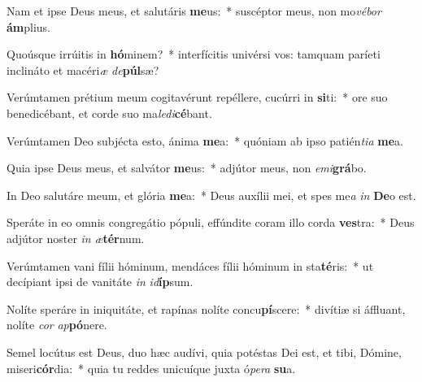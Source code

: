 \item Nam et ipse Deus meus, et salutáris \textbf{me}us:~* suscéptor meus, non mo\textit{vé}\textit{bor} \textbf{ám}plius.
\item Quoúsque irrúitis in \textbf{hó}minem?~* interfícitis univérsi vos: tamquam paríeti inclináto et macéri\textit{æ} \textit{de}\textbf{púl}sæ?
\item Verúmtamen prétium meum cogitavérunt repéllere, cucúrri in \textbf{si}ti:~* ore suo benedicébant, et corde suo ma\textit{le}\textit{di}\textbf{cé}bant.
\item Verúmtamen Deo subjécta esto, ánima \textbf{me}a:~* quóniam ab ipso patién\textit{ti}\textit{a} \textbf{me}a.
\item Quia ipse Deus meus, et salvátor \textbf{me}us:~* adjútor meus, non \textit{e}\textit{mi}\textbf{grá}bo.
\item In Deo salutáre meum, et glória \textbf{me}a:~* Deus auxílii mei, et spes me\textit{a} \textit{in} \textbf{De}o est.
\item Speráte in eo omnis congregátio pópuli, effúndite coram illo corda \textbf{ves}tra:~* Deus adjútor noster \textit{in} \textit{æ}\textbf{tér}num.
\item Verúmtamen vani fílii hóminum, mendáces fílii hóminum in sta\textbf{té}ris:~* ut decípiant ipsi de vanitáte \textit{in} \textit{id}\textbf{íp}sum.
\item Nolíte speráre in iniquitáte, et rapínas nolíte concu\textbf{pí}scere:~* divítiæ si áffluant, nolíte \textit{cor} \textit{ap}\textbf{pó}nere.
\item Semel locútus est Deus, duo hæc audívi, quia potéstas Dei est, et tibi, Dómine, miseri\textbf{cór}dia:~* quia tu reddes unicuíque juxta ó\textit{pe}\textit{ra} \textbf{su}a.
